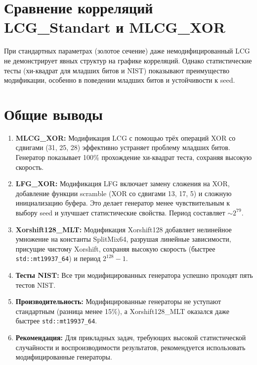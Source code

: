 \documentclass[twoside]{book}
\newcommand{\+}{\discretionary{\mbox{\scriptsize$\hookleftarrow$}}{}{}}
\begin{document}
\section{Сравнение корреляций LCG\_Standart и MLCG\_XOR}
При стандартных параметрах (золотое сечение) даже немодифицированный LCG не демонстрирует явных структур на графике корреляций. Однако статистические тесты (хи-квадрат для младших битов и NIST) показывают преимущество модификации, особенно в поведении младших битов и устойчивости к seed.

\section*{Общие выводы}

\begin{enumerate}
    \item \textbf{MLCG\_XOR:} Модификация LCG с помощью трёх операций XOR со сдвигами (31, 25, 28) эффективно устраняет проблему младших битов. Генератор показывает 100\% прохождение хи-квадрат теста, сохраняя высокую скорость.
    
    \item \textbf{LFG\_XOR:} Модификация LFG включает замену сложения на XOR, добавление функции scramble (XOR со сдвигами 13, 17, 5) и сложную инициализацию буфера. Это делает генератор менее чувствительным к выбору seed и улучшает статистические свойства. Период составляет \(\sim 2^{79}\).
    
    \item \textbf{Xorshift128\_MLT:} Модификация Xorshift128 добавляет нелинейное умножение на константы SplitMix64, разрушая линейные зависимости, присущие чистому Xorshift, сохраняя высокую скорость (быстрее \texttt{std::mt19937\_64}) и период \(2^{128}-1\).
    
    \item \textbf{Тесты NIST:} Все три модифицированных генератора успешно проходят пять тестов NIST.
    
    \item \textbf{Производительность:} Модифицированные генераторы не уступают стандартным (разница менее 15\%), а Xorshift128\_MLT оказался даже быстрее \texttt{std::mt19937\_64}.
    
    \item \textbf{Рекомендация:} Для прикладных задач, требующих высокой статистической случайности и воспроизводимости результатов, рекомендуется использовать модифицированные генераторы.
\end{enumerate}
\end{document}
